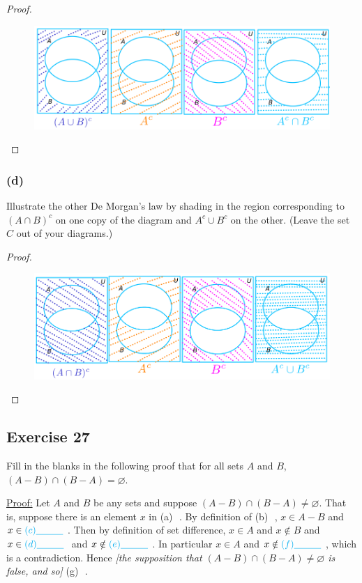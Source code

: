 \documentclass[14pt]{extarticle}
\newcommand{\es}{\varnothing}
\newcommand{\fbl}{\underline{\hspace{1cm}}\,\,}
\newcommand{\cy}{\color{cyan}}
\begin{document}
\begin{proof}
\begin{figure}[ht!]
\centering
\includegraphics[scale=0.5]{../images/6.2.26.c.png}
\end{figure}
\end{proof}

\subsubsection{(d)}
Illustrate the other De Morgan’s law by shading in the region corresponding to \((A \cap B)^c\) on one copy of the 
diagram and \(A^c \cup B^c\) on the other. (Leave the set $C$ out of your diagrams.)

\begin{proof}
\begin{figure}[ht!]
\centering
\includegraphics[scale=0.5]{../images/6.2.26.d.png}
\end{figure}
\end{proof}

\subsection{Exercise 27}
Fill in the blanks in the following proof that for all sets $A$ and $B$, \((A - B) \cap (B - A) = \es\).

\underline{Proof:} Let $A$ and $B$ be any sets and suppose \((A - B) \cap (B - A) \neq \es\). That is, suppose there 
is an element $x$ in {\cy (a) \fbl}. By definition of {\cy (b) \fbl}, \(x \in A - B\) and \(x \in {\cy (c) \fbl}\). 
Then by definition of set difference, $x \in A$ and $x \notin B$ and \(x \in {\cy (d) \fbl}\) and \(x \notin {\cy 
(e) \fbl}\). In particular $x \in A$ and \(x \notin {\cy (f) \fbl}\), which is a contradiction. Hence {\it [the 
supposition that \((A - B) \cap (B - A) \neq \es\) is false, and so]} {\cy (g) \fbl}.
\end{document}
